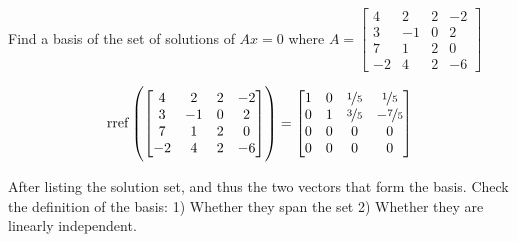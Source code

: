 \begin{example}
	Find a basis of the set of solutions of $Ax = 0$ where $A = \begin{bmatrix}
		4&2&2&-2\\
		3&-1&0&2\\
		7&1&2&0\\
		-2&4&2&-6
	\end{bmatrix}$
\end{example}

\begin{sol}
	\[\mathrm{rref}\left(\begin{bmatrix}
		4&2&2&-2\\
		3&-1&0&2\\
		7&1&2&0\\
		-2&4&2&-6
	\end{bmatrix}\right) = \begin{bmatrix}
		1&0&\nicefrac{1}{5}&\nicefrac{1}{5}\\
		0&1&\nicefrac{3}{5}&-\nicefrac{7}{5}\\
		0&0&0&0\\
		0&0&0&0
	\end{bmatrix}\]

	After listing the solution set, and thus the two vectors that form the basis. Check the definition of the basis: 1) Whether they span the set 2) Whether they are linearly independent.
\end{sol}